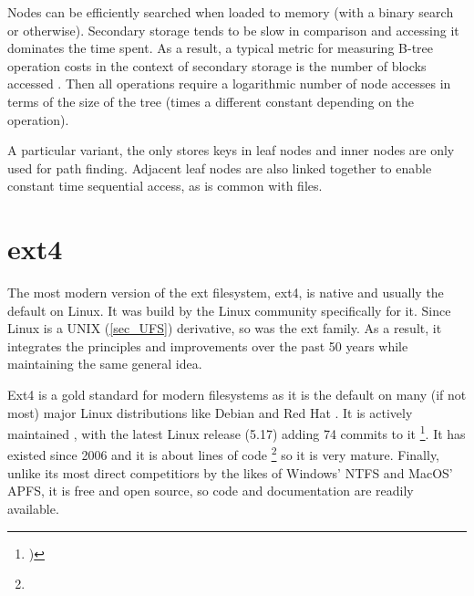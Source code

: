         Nodes can be efficiently searched when loaded to memory (with a binary
        search or otherwise). Secondary storage tends to be slow in comparison
        and accessing it dominates the time spent. As a result, a typical
        metric for measuring B-tree operation costs in the context of secondary
        storage is the number of blocks accessed \cite{btree_ubiquitous}. Then
        all operations require a logarithmic number of node accesses in terms
        of the size of the tree (times a different constant depending on the
        operation).

        A particular variant, the \bplustree only stores keys in leaf nodes and
        inner nodes are only used for path finding. Adjacent leaf nodes are
        also linked together to enable constant time sequential access, as is
        common with files.

    \section{ext4}
        \label{sec_ext4}

        The most modern version of the ext filesystem, ext4, is native and
        usually the default on Linux. It was build by the Linux community
        specifically for it. Since Linux is a UNIX (\ref{sec_UFS}) derivative,
        so was the ext family. As a result, it integrates the principles and
        improvements over the past 50 years while maintaining the same general
        idea.

        Ext4 is a gold standard for modern filesystems as it is the default on
        many (if not most) major Linux distributions like Debian
        \cite{Debian_filesystem} and Red Hat \cite{RedHat_filesystem}. It is
        actively maintained \cite{ext4_mailing_list}, with the latest Linux
        release (5.17) adding 74 commits to it \footnote{)}. It has existed since 2006
        \cite{ext4_origin} and it is about  lines of code
        \footnote{} so it is very mature. Finally,
        unlike its most direct competitiors by the likes of Windows' NTFS and
        MacOS' APFS, it is free and open source, so code and documentation are
        readily available.

